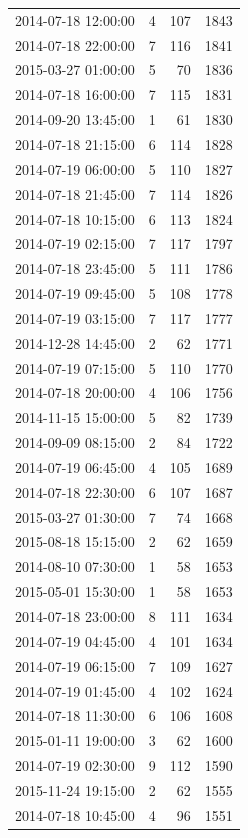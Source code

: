 \begin{tabular}{lrrr}
2014-07-18 12:00:00 & 4 & 107 & 1843 \\
2014-07-18 22:00:00 & 7 & 116 & 1841 \\
2015-03-27 01:00:00 & 5 & 70 & 1836 \\
2014-07-18 16:00:00 & 7 & 115 & 1831 \\
2014-09-20 13:45:00 & 1 & 61 & 1830 \\
2014-07-18 21:15:00 & 6 & 114 & 1828 \\
2014-07-19 06:00:00 & 5 & 110 & 1827 \\
2014-07-18 21:45:00 & 7 & 114 & 1826 \\
2014-07-18 10:15:00 & 6 & 113 & 1824 \\
2014-07-19 02:15:00 & 7 & 117 & 1797 \\
2014-07-18 23:45:00 & 5 & 111 & 1786 \\
2014-07-19 09:45:00 & 5 & 108 & 1778 \\
2014-07-19 03:15:00 & 7 & 117 & 1777 \\
2014-12-28 14:45:00 & 2 & 62 & 1771 \\
2014-07-19 07:15:00 & 5 & 110 & 1770 \\
2014-07-18 20:00:00 & 4 & 106 & 1756 \\
2014-11-15 15:00:00 & 5 & 82 & 1739 \\
2014-09-09 08:15:00 & 2 & 84 & 1722 \\
2014-07-19 06:45:00 & 4 & 105 & 1689 \\
2014-07-18 22:30:00 & 6 & 107 & 1687 \\
2015-03-27 01:30:00 & 7 & 74 & 1668 \\
2015-08-18 15:15:00 & 2 & 62 & 1659 \\
2014-08-10 07:30:00 & 1 & 58 & 1653 \\
2015-05-01 15:30:00 & 1 & 58 & 1653 \\
2014-07-18 23:00:00 & 8 & 111 & 1634 \\
2014-07-19 04:45:00 & 4 & 101 & 1634 \\
2014-07-19 06:15:00 & 7 & 109 & 1627 \\
2014-07-19 01:45:00 & 4 & 102 & 1624 \\
2014-07-18 11:30:00 & 6 & 106 & 1608 \\
2015-01-11 19:00:00 & 3 & 62 & 1600 \\
2014-07-19 02:30:00 & 9 & 112 & 1590 \\
2015-11-24 19:15:00 & 2 & 62 & 1555 \\
2014-07-18 10:45:00 & 4 & 96 & 1551 \\

\end{tabular}

